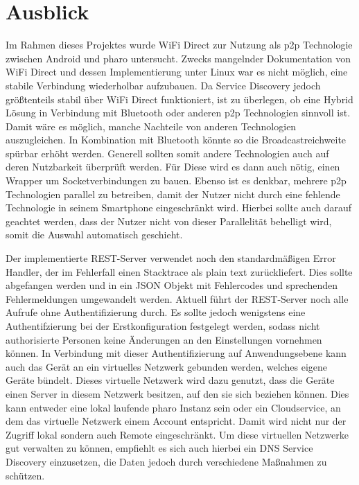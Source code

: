 \section{Ausblick}
	Im Rahmen dieses Projektes wurde WiFi Direct zur Nutzung als p2p Technologie zwischen Android und pharo untersucht. Zwecks mangelnder Dokumentation von WiFi Direct und dessen Implementierung unter Linux war es nicht möglich, eine stabile Verbindung wiederholbar aufzubauen. Da Service Discovery jedoch größtenteils stabil über WiFi Direct funktioniert, ist zu überlegen, ob eine Hybrid Lösung in Verbindung mit Bluetooth oder anderen p2p Technologien sinnvoll ist. Damit wäre es möglich, manche Nachteile von anderen Technologien auszugleichen. In Kombination mit Bluetooth könnte so die Broadcastreichweite spürbar erhöht werden. Generell sollten somit andere Technologien auch auf deren Nutzbarkeit überprüft werden. Für Diese wird es dann auch nötig, einen Wrapper um Socketverbindungen zu bauen.
	Ebenso ist es denkbar, mehrere p2p Technologien parallel zu betreiben, damit der Nutzer nicht durch eine fehlende Technologie in seinem Smartphone eingeschränkt wird. Hierbei sollte auch darauf geachtet werden, dass der Nutzer nicht von dieser Parallelität behelligt wird, somit die Auswahl automatisch geschieht.
	
	Der implementierte REST-Server verwendet noch den standardmäßigen Error Handler, der im Fehlerfall einen Stacktrace als plain text zurückliefert. Dies sollte abgefangen werden und in ein JSON Objekt mit Fehlercodes und sprechenden Fehlermeldungen umgewandelt werden. Aktuell führt der REST-Server noch alle Aufrufe ohne Authentifizierung durch. Es sollte jedoch wenigstens eine Authentifzierung bei der Erstkonfiguration festgelegt werden, sodass nicht authorisierte Personen keine Änderungen an den Einstellungen vornehmen können.
	In Verbindung mit dieser Authentifizierung auf Anwendungsebene kann auch das Gerät an ein virtuelles Netzwerk gebunden werden, welches eigene Geräte bündelt. Dieses virtuelle Netzwerk wird dazu genutzt, dass die Geräte einen Server in diesem Netzwerk besitzen, auf den sie sich beziehen können. Dies kann entweder eine lokal laufende pharo Instanz sein oder ein Cloudservice, an dem das virtuelle Netzwerk einem Account entspricht. Damit wird nicht nur der Zugriff lokal sondern auch Remote eingeschränkt. Um diese virtuellen Netzwerke gut verwalten zu können, empfiehlt es sich auch hierbei ein DNS Service Discovery einzusetzen, die Daten jedoch durch verschiedene Maßnahmen zu schützen. \cite[S.8]{Kaiser2}
	
